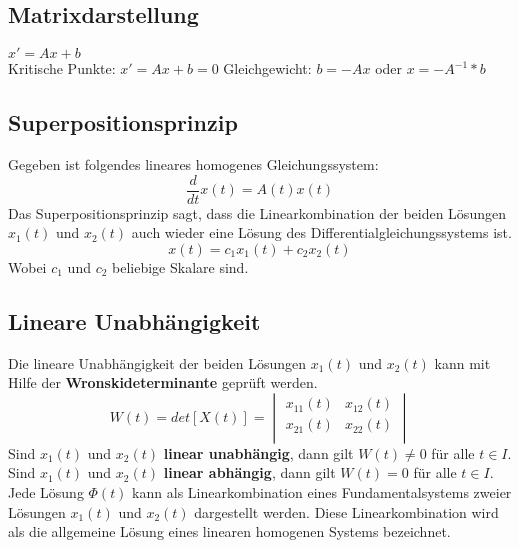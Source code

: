 \subsection{Matrixdarstellung}
$x' = Ax + b$\\
Kritische Punkte: $x' = Ax + b = 0$ Gleichgewicht: $b = -Ax$ oder $x = -A^{-1}*b$\\


\subsection{Superpositionsprinzip}
Gegeben ist folgendes lineares homogenes Gleichungssystem:
\begin{equation*}
\frac{d}{dt}x(t) = A(t)x(t)
\end{equation*}
Das Superpositionsprinzip sagt, dass die Linearkombination der beiden Lösungen $x_1(t)$ und $x_2(t)$ auch wieder eine Lösung des Differentialgleichungssystems ist. 
\begin{equation*}
	x(t) = c_1 x_1(t) + c_2 x_2(t)
\end{equation*}
Wobei $c_1$ und $c_2$ beliebige Skalare sind. 
\subsection{Lineare Unabhängigkeit}
Die lineare Unabhängigkeit der beiden Lösungen $x_1(t)$ und $x_2(t)$ kann mit Hilfe der \textbf{Wronskideterminante} geprüft werden. 
\begin{equation*}
	W(t) = det[X(t)] =    
	\begin{vmatrix} 
	        x_{11}(t) & x_{12}(t)\\ 
	        x_{21}(t) & x_{22}(t)\\   
	\end{vmatrix}
\end{equation*}
Sind $x_1(t)$ und $x_2(t)$ \textbf{linear unabhängig}, dann gilt $W(t) \neq 0$ für alle $t \in I$. \\
Sind $x_1(t)$ und $x_2(t)$ \textbf{linear abhängig}, dann gilt $W(t) = 0$ für alle $t \in I$. \\
Jede Lösung $\Phi(t)$ kann als Linearkombination eines Fundamentalsystems zweier Lösungen $x_1(t)$ und $x_2(t)$ dargestellt werden. Diese Linearkombination wird als die allgemeine Lösung eines linearen homogenen Systems bezeichnet. 
